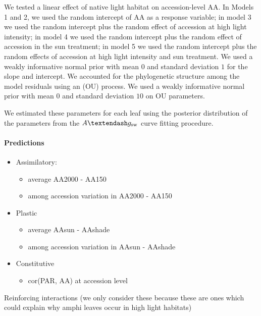 \documentclass[
  letterpaper,
  DIV=11,
  numbers=noendperiod]{scrartcl}
\let\oldparagraph\paragraph
\renewcommand{\paragraph}[1]{\oldparagraph{#1}\mbox{}}
\providecommand{\tightlist}{%
  \setlength{\itemsep}{0pt}\setlength{\parskip}{0pt}}\usepackage{longtable,booktabs,array}
\newcommand{\aax}{$\mathrm{AA}$}
\newcommand{\agcurve}{$A \textendash g_\text{sw}$}
\begin{document}
We tested a linear effect of native light habitat on accession-level
\aax. In Models 1 and 2, we used the random intercept of \aax{} as a
response variable; in model 3 we used the random intercept plus the
random effect of accession at high light intensity; in model 4 we used
the random intercept plus the random effect of accession in the sun
treatment; in model 5 we used the random intercept plus the random
effects of accession at high light intensity and sun treatment. We used
a weakly informative normal prior with mean \(0\) and standard deviation
\(1\) for the slope and intercept. We accounted for the phylogenetic
structure among the model residuals using an (OU) process. We used a
weakly informative normal prior with mean \(0\) and standard deviation
\(10\) on OU parameters.

We estimated these parameters for each leaf using the posterior
distribution of the parameters from the \agcurve{} curve fitting
procedure.

\paragraph{Predictions}\label{predictions}

\begin{itemize}
\tightlist
\item
  Assimilatory:

  \begin{itemize}
  \tightlist
  \item
    average AA2000 - AA150
  \item
    among accession variation in AA2000 - AA150
  \end{itemize}
\item
  Plastic

  \begin{itemize}
  \tightlist
  \item
    average AAsun - AAshade
  \item
    among accession variation in AAsun - AAshade
  \end{itemize}
\item
  Constitutive

  \begin{itemize}
  \tightlist
  \item
    cor(PAR, AA) at accession level
  \end{itemize}
\end{itemize}

Reinforcing interactions (we only consider these because these are ones
which could explain why amphi leaves occur in high light habitats)
\end{document}
